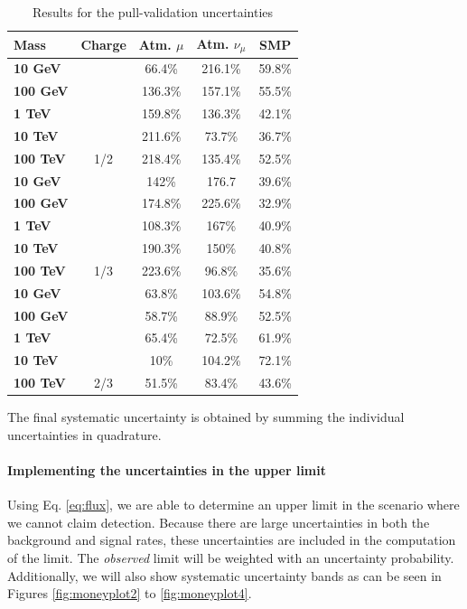 \begin{table}[]
\centering
\caption{Results for the pull-validation uncertainties}
\label{tab:pvuncertainties}
\begin{tabular}{|l |c|c|c|c|}
\hline
\cellcolor[HTML]{F1A91E}Mass & \cellcolor[HTML]{F1A91E}Charge & \cellcolor[HTML]{F1A91E}Atm. $\mu$ & \cellcolor[HTML]{F1A91E}Atm. $\nu_\mu$ & \cellcolor[HTML]{F1A91E}SMP \\ \hline
\textbf{10 GeV} &  & 66.4\% & 216.1\% & 59.8\% \\ \cline{3-5}
\textbf{100 GeV} &  & 136.3\% & 157.1\% & 55.5\% \\ \cline{3-5}
\textbf{1 TeV} &  & 159.8\% & 136.3\% & 42.1\% \\ \cline{3-5}
\textbf{10 TeV} &  & 211.6\% & 73.7\% & 36.7\% \\ \cline{3-5}
\textbf{100 TeV} & \multirow{-5}{*}{1/2} & 218.4\% & 135.4\% & 52.5\% \\ \hline
\textbf{10 GeV} & & 142\% & 176.7 & 39.6\% \\ \cline{3-5}
\textbf{100 GeV} & & 174.8\% & 225.6\% & 32.9\% \\ \cline{3-5}
\textbf{1 TeV} & & 108.3\% & 167\% & 40.9\% \\ \cline{3-5}
\textbf{10 TeV} & & 190.3\% & 150\% & 40.8\% \\\cline{3-5}
\textbf{100 TeV} & \multirow{-5}{*}{1/3} & 223.6\% & 96.8\% & 35.6\% \\ \hline
\textbf{10 GeV} & & 63.8\% & 103.6\% & 54.8\% \\ \cline{3-5}
\textbf{100 GeV} & & 58.7\% & 88.9\% & 52.5\% \\\cline{3-5}
\textbf{1 TeV} & & 65.4\% & 72.5\% & 61.9\% \\ \cline{3-5}
\textbf{10 TeV} & & 10\% & 104.2\% & 72.1\% \\ \cline{3-5}
\textbf{100 TeV} & \multirow{-5}{*}{2/3} & 51.5\% & 83.4\% & 43.6\% \\ \hline
\end{tabular}
\end{table}

\noindent The final systematic uncertainty is obtained by summing the individual uncertainties in quadrature.

\paragraph{Implementing the uncertainties in the upper limit}
Using Eq. \ref{eq:flux}, we are able to determine an upper limit in the scenario where we cannot claim detection. Because there are large uncertainties in both the background and signal rates, these uncertainties are included in the computation of the limit. The \textit{observed} limit will be weighted with an uncertainty probability. Additionally, we will also show systematic uncertainty bands as can be seen in Figures \ref{fig:moneyplot2} to \ref{fig:moneyplot4}. 

